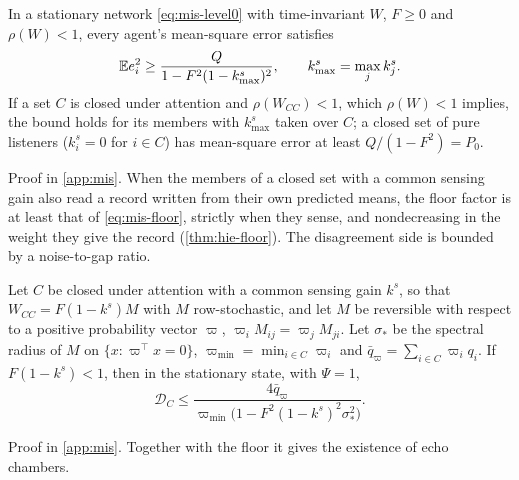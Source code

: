 \begin{proposition}\label{prop:mis-mse-floor}
In a stationary network \eqref{eq:mis-level0} with time-invariant $W$, $F\ge0$ and $\rho(W)<1$, every agent's mean-square error satisfies
\begin{equation}\label{eq:mis-floor}
\mathbb{E} e_i^2\ge\frac{Q}{1-F^2(1-k^s_{\max})^2},\qquad k^s_{\max}=\max_jk^s_j.
\end{equation}
If a set $C$ is closed under attention and $\rho(W_{CC})<1$, which $\rho(W)<1$ implies, the bound holds for its members with $k^s_{\max}$ taken over $C$; a closed set of pure listeners ($k^s_i=0$ for $i\in C$) has mean-square error at least $Q/(1-F^2)=P_0$.
\end{proposition}

Proof in \cref{app:mis}. When the members of a closed set with a common sensing gain also read a record written from their own predicted means, the floor factor is at least that of \eqref{eq:mis-floor}, strictly when they sense, and nondecreasing in the weight they give the record (\cref{thm:hie-floor}). The disagreement side is bounded by a noise-to-gap ratio.

\begin{lemma}\label{lem:mis-disagreement}
Let $C$ be closed under attention with a common sensing gain $k^s$, so that $W_{CC}=F(1-k^s)M$ with $M$ row-stochastic, and let $M$ be reversible with respect to a positive probability vector $\varpi$, $\varpi_iM_{ij}=\varpi_jM_{ji}$. Let $\sigma_\ast$ be the spectral radius of $M$ on $\{x:\varpi^\top x=0\}$, $\varpi_{\min}=\min_{i\in C}\varpi_i$ and $\bar q_\varpi=\sum_{i\in C}\varpi_iq_i$. If $F(1-k^s)<1$, then in the stationary state, with $\Psi=1$,
\begin{equation}\label{eq:mis-disagreement}
\mathcal D_C\le\frac{4\bar q_\varpi}{\varpi_{\min}\bigl(1-F^2(1-k^s)^2\sigma_\ast^2\bigr)} .
\end{equation}
\end{lemma}

Proof in \cref{app:mis}. Together with the floor it gives the existence of echo chambers.


